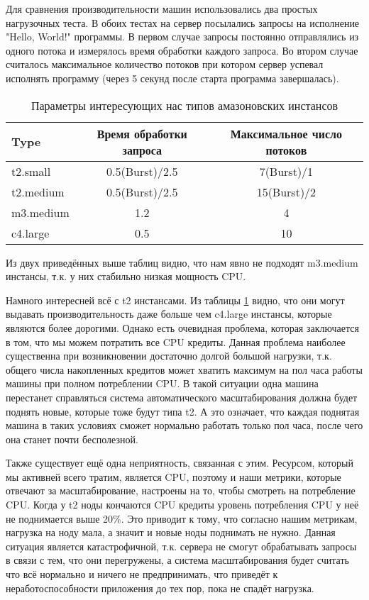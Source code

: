 	Для сравнения производительности машин использовались два простых нагрузочных теста. В обоих тестах на сервер посылались запросы на исполнение "Hello, World!" программы. В первом случае запросы постоянно отправлялись из одного потока и измерялось время обработки каждого запроса. Во втором случае считалось максимальное количество потоков при котором сервер успевал исполнять программу (через 5 секунд после старта программа завершалась).
	
\begin{table}[h]
	\centering
	\begin{tabular}{l|c|c}
		Type      & Время обработки запроса    & Максимальное число потоков\\ \hline
		t2.small  & 0.5(Burst)/2.5             & 7(Burst)/1  \\ \hline
		t2.medium & 0.5(Burst)/2.5             & 15(Burst)/2 \\ \hline
		m3.medium & 1.2                        & 4           \\ \hline
		c4.large  & 0.5                        & 10          \\
	\end{tabular}
	\caption{Параметры интересующих нас типов амазоновских инстансов}
	\label{table:instance_types_performance}
\end{table}

	Из двух приведённых выше таблиц видно, что нам явно не подходят m3.medium инстансы, т.к. у них стабильно низкая мощность CPU.
	
	Намного интересней всё с t2 инстансами. Из таблицы \ref{table:instance_types_performance}	 видно, что они могут выдавать производительность даже больше чем c4.large инстансы, которые являются более дорогими. Однако есть очевидная проблема, которая заключается в том, что мы можем потратить все CPU кредиты. Данная проблема наиболее существенна при возникновении достаточно долгой большой нагрузки, т.к. общего числа накопленных кредитов может хватить максимум на пол часа работы машины при полном потреблении CPU. В такой ситуации одна машина перестанет справляться система автоматического масштабирования должна будет поднять новые, которые тоже будут типа t2. А это означает, что каждая поднятая машина в таких условиях сможет нормально работать только пол часа, после чего она станет почти бесполезной. 
	
	Также существует ещё одна неприятность, связанная с этим. Ресурсом, который мы активней всего тратим, является CPU, поэтому и наши метрики, которые отвечают за масштабирование, настроены на то, чтобы смотреть на потребление CPU. Когда у t2 ноды кончаются CPU кредиты уровень потребления CPU у неё не поднимается выше 20\%. Это приводит к тому, что согласно нашим метрикам, нагрузка на ноду мала, а значит и новые ноды поднимать не нужно. Данная ситуация является катастрофичной, т.к. сервера не смогут обрабатывать запросы в связи с тем, что они перегружены, а система масштабирования будет считать что всё нормально и ничего не предпринимать, что приведёт к неработоспособности приложения до тех пор, пока не спадёт нагрузка.
	
